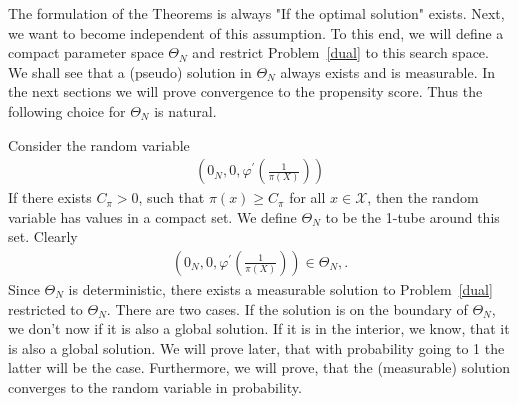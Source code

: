 The formulation of the Theorems is always "If the optimal solution" exists.
Next, we want to become independent of this assumption.
To this end, we will define a compact parameter space $\Theta_N$ and restrict Problem~\ref{dual} to this search space.  
We shall see that a (pseudo) solution in $\Theta_N$ always exists and is measurable. 
In the next sections we will prove convergence to the propensity score. Thus the following choice for $\Theta_N$ is natural. 

Consider 
the random variable
\begin{align*}
  \left(
  0_{N},0,
  \varphi^{'}
  \left(
  \frac
  {1}
  {\pi(X)}
  \right)
  \right)
\end{align*}
If there exists $C_{\pi}>0$, such that $\pi(x)\ge C_\pi$ for all $x\in\mathcal{X}$, 
then 
the random variable has values in a compact set. 
We define $\Theta_N$ to be the 1-tube around this set. 
Clearly
\begin{align*}
  \left(
  0_{N},0,
  \varphi^{'}
  \left(
  \frac
  {1}
  {\pi(X)}
  \right)
  \right)
  \in 
  \Theta_N
  ,.
\end{align*}
Since $\Theta_N$ is deterministic, there exists a measurable solution to Problem~\ref{dual} restricted to $\Theta_N$.
There are two cases. If the solution is on the boundary of $\Theta_N$, we don't now if it is also a global solution.
If it is in the interior, we know, that it is also a global solution.
We will prove later, that with probability going to 1 the latter will be the case.
Furthermore, we will prove, that the (measurable) solution converges to the random variable in probability.

